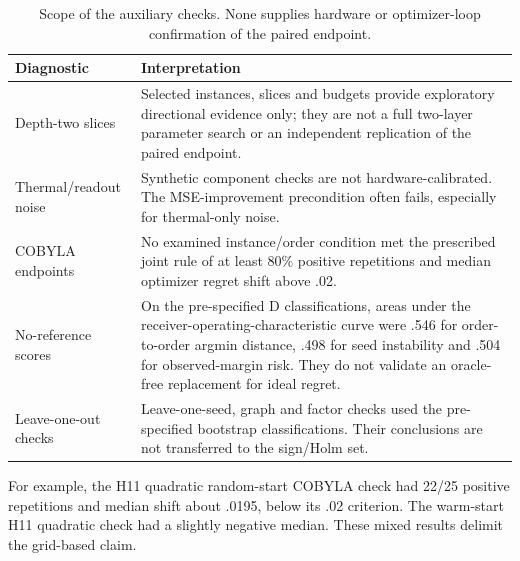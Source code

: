 \begin{table}[htbp]\centering\small
\caption{Scope of the auxiliary checks. None supplies hardware or optimizer-loop confirmation of the paired endpoint.}
\begin{tabular}{L{.22\textwidth}L{.68\textwidth}}\hline
Diagnostic & Interpretation\\\hline
Depth-two slices & Selected instances, slices and budgets provide exploratory directional evidence only; they are not a full two-layer parameter search or an independent replication of the paired endpoint.\\
Thermal/readout noise & Synthetic component checks are not hardware-calibrated. The MSE-improvement precondition often fails, especially for thermal-only noise.\\
COBYLA endpoints & No examined instance/order condition met the prescribed joint rule of at least 80\% positive repetitions and median optimizer regret shift above .02.\\
No-reference scores & On the pre-specified D classifications, areas under the receiver-operating-characteristic curve were .546 for order-to-order argmin distance, .498 for seed instability and .504 for observed-margin risk. They do not validate an oracle-free replacement for ideal regret.\\
Leave-one-out checks & Leave-one-seed, graph and factor checks used the pre-specified bootstrap classifications. Their conclusions are not transferred to the sign/Holm set.\\\hline
\end{tabular}
\end{table}

For example, the H11 quadratic random-start COBYLA check had 22/25 positive repetitions and median shift about .0195, below its .02 criterion. The warm-start H11 quadratic check had a slightly negative median. These mixed results delimit the grid-based claim.
